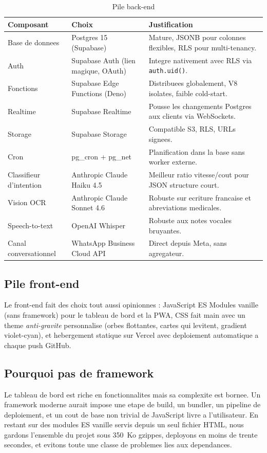 \begin{table}[H]
  \centering\footnotesize
  \begin{tabular}{p{3.5cm}p{4cm}p{6cm}}
    \toprule
    \textbf{Composant} & \textbf{Choix} & \textbf{Justification} \\
    \midrule
    Base de donnees & Postgres 15 (Supabase) & Mature, JSONB pour colonnes flexibles, RLS pour multi-tenancy. \\
    Auth & Supabase Auth (lien magique, OAuth) & Integre nativement avec RLS via \texttt{auth.uid()}. \\
    Fonctions & Supabase Edge Functions (Deno) & Distribuees globalement, V8 isolates, faible cold-start. \\
    Realtime & Supabase Realtime & Pousse les changements Postgres aux clients via WebSockets. \\
    Storage & Supabase Storage & Compatible S3, RLS, URLs signees. \\
    Cron & pg\_cron + pg\_net & Planification dans la base sans worker externe. \\
    Classifieur d'intention & Anthropic Claude Haiku 4.5 & Meilleur ratio vitesse/cout pour JSON structure court. \\
    Vision OCR & Anthropic Claude Sonnet 4.6 & Robuste sur ecriture francaise et abreviations medicales. \\
    Speech-to-text & OpenAI Whisper & Robuste aux notes vocales bruyantes. \\
    Canal conversationnel & WhatsApp Business Cloud API & Direct depuis Meta, sans agregateur. \\
    \bottomrule
  \end{tabular}
  \caption{Pile back-end}
  \label{tab:back}
\end{table}

\subsection{Pile front-end}
Le front-end fait des choix tout aussi opinionnes : JavaScript ES Modules
vanille (sans framework) pour le tableau de bord et la PWA, CSS fait main
avec un theme \emph{anti-gravite} personnalise (orbes flottantes, cartes
qui levitent, gradient violet-cyan), et hebergement statique sur Vercel
avec deploiement automatique a chaque push GitHub.

\subsection{Pourquoi pas de framework}
Le tableau de bord est riche en fonctionnalites mais sa complexite est
bornee. Un framework moderne aurait impose une etape de build, un bundler,
un pipeline de deploiement, et un cout de base non trivial de JavaScript
livre a l'utilisateur. En restant sur des modules ES vanille servis depuis
un seul fichier HTML, nous gardons l'ensemble du projet sous 350~Ko
gzippes, deployons en moins de trente secondes, et evitons toute une
classe de problemes lies aux dependances.

